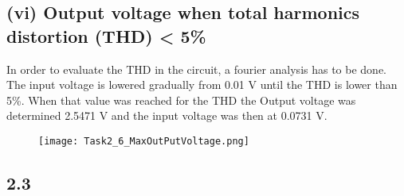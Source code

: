   \subsection*{(vi) Output voltage when total harmonics distortion (THD) < 5\%}
  In order to evaluate the THD in the circuit, a fourier analysis has to be done. The input voltage is lowered gradually from 0.01 V until the THD is lower than 5\%. When that value was reached for the THD the Output voltage was determined 2.5471 V and the input voltage was then at 0.0731 V.
  \begin{figure}[h!]
        \centering
        \texttt{[image: Task2\_6\_MaxOutPutVoltage.png]}
    \end{figure}
    
\pagebreak
  
\subsection*{2.3}
  